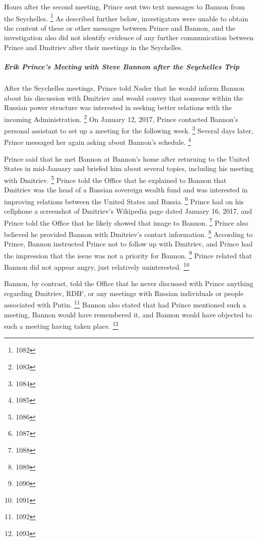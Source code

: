 Hours after the second meeting, Prince sent two text messages to Bannon from the Seychelles.%
\footnote{1082}
As described further below, investigators were unable to obtain the content of these or other messages between Prince and Bannon, and the investigation also did not identify evidence of any further communication between Prince and Dmitriev after their meetings in the Seychelles.

\subparagraph{Erik Prince's Meeting with Steve Bannon after the Seychelles Trip}

After the Seychelles meetings, Prince told Nader that he would inform Bannon about his discussion with Dmitriev and would convey that someone within the Russian power structure was interested in seeking better relations with the incoming Administration.%
\footnote{1083}
On January 12, 2017, Prince contacted Bannon's personal assistant to set up a meeting for the following week.%
\footnote{1084}
Several days later, Prince messaged her again asking about Bannon's schedule.%
\footnote{1085}

Prince said that he met Bannon at Bannon's home after returning to the United States in mid-January and briefed him about several topics, including his meeting with Dmitriev.%
\footnote{1086}
Prince told the Office that he explained to Bannon that Dmitriev was the head of a Russian sovereign wealth fund and was interested in improving relations between the United States and Russia.%
\footnote{1087}
Prince had on his cellphone a screenshot of Dmitriev's Wikipedia page dated January 16, 2017, and Prince told the Office that he likely showed that image to Bannon.%
\footnote{1088}
Prince also believed he provided Bannon with Dmitriev's contact information.%
\footnote{1089}
According to Prince, Bannon instructed Prince not to follow up with Dmitriev, and Prince had the impression that the issue was not a priority for Bannon.%
\footnote{1090}
Prince related that Bannon did not appear angry, just relatively uninterested.%
\footnote{1091}

Bannon, by contrast, told the Office that he never discussed with Prince anything regarding Dmitriev, RDIF, or any meetings with Russian individuals or people associated with Putin.%
\footnote{1092}
Bannon also stated that had Prince mentioned such a meeting, Bannon would have remembered it, and Bannon would have objected to such a meeting having taken place.%
\footnote{1093}

